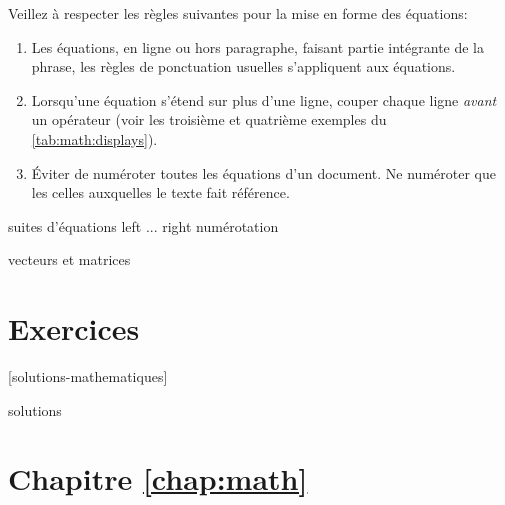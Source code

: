\begin{conseil}
  Veillez à respecter les règles suivantes pour la mise en forme des
  équations:
  \begin{enumerate}
  \item Les équations, en ligne ou hors paragraphe, faisant partie
    intégrante de la phrase, les règles de ponctuation usuelles
    s'appliquent aux équations.
  \item Lorsqu'une équation s'étend sur plus d'une ligne, couper
    chaque ligne \emph{avant} un opérateur (voir les troisième et
    quatrième exemples du \autoref{tab:math:displays}).
  \item Éviter de numéroter toutes les équations d'un document. Ne
    numéroter que les celles auxquelles le texte fait référence.
  \end{enumerate}
\end{conseil}



suites d'équations
  left ... right
  numérotation

vecteurs et matrices


\section{Exercices}
\label{sec:math:exercices}

[solutions-mathematiques]

\begin{Filesave}{solutions}
\section*{Chapitre \ref*{chap:math}}

\end{Filesave}




